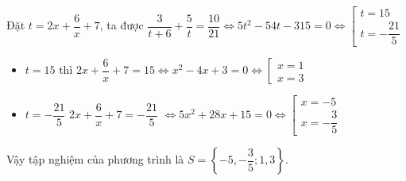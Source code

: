 \begin{bt}
{\begin{enumerate}[a)]
	Đặt $t = 2x + \dfrac{6}{x} + 7$, ta được $\dfrac{3}{t + 6} + \dfrac{5}{t} = \dfrac{10}{21} \Leftrightarrow 5t^2 - 54t - 315 = 0 \Leftrightarrow \left[ \begin{array}{l}
		t = 15\\
		t =  - \dfrac{21}{5}
		\end{array} \right.$ 
	\begin{itemize}
		\item $t = 15$ thì  $2x + \dfrac{6}{x} + 7 = 15 \Leftrightarrow x^2 - 4x + 3 = 0 \Leftrightarrow \left[ \begin{array}{l}
			x = 1\\
			x = 3
			\end{array} \right.$
	\end{itemize}
	\begin{itemize}
		\item $t =  - \dfrac{21}{5}$    $2x + \dfrac{6}{x} + 7 =  - \dfrac{21}{5}$ $\Leftrightarrow 5x^2 + 28x + 15 = 0 \Leftrightarrow \left[ \begin{array}{l}
			x =  - 5\\
			x =  - \dfrac{3}{5}
			\end{array} \right.$
	\end{itemize}
	Vậy tập nghiệm của phương trình là $S = \left\{  - 5, - \dfrac{3}{5};1,3 \right\}.$
	\end{enumerate}
}
\end{bt}

